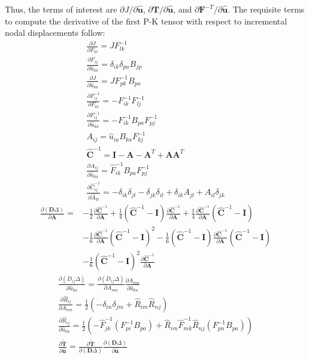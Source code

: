 Thus, the terms of interest are ${\partial J}/{\partial \hat{\bm{u}}}$, ${\partial \bm{T}}/{\partial \hat{\bm{u}}}$, and ${\partial \bm{F}^{-T}}/{\partial \hat{\bm{u}}}$. The requisite terms to compute the derivative of the first P-K tensor with respect to incremental nodal displacements follow:
\begin{gather}
\frac{\partial J}{\partial F_{kl}} = JF_{lk}^{{-1}} \\
\frac{\partial F_{ij}}{\partial \hat{u}_{ka}} = \delta_{ik}\delta_{pa}B_{jp} \\
\frac{\partial J}{\partial \hat{u}_{ka}} = JF_{pk}^{-1}B_{pa} \\
\frac{\partial F_{ij}^{-1}}{\partial F_{kl}} = - F_{ik}^{-1}F_{lj}^{-1} \\
\frac{\partial F_{ij}^{-1}}{\partial \hat{u}_{ka}} = - F_{ik}^{-1}B_{pa}F_{pj}^{-1} \\
A_{ij} = \hat{u}_{ia}B_{ka}F^{-1}_{kj} \\
\hat{{\bm C}}^{-1} = {\bm I} - {\bm A} - {\bm A}^T + {\bm A}{\bm A}^T \\
\frac{\partial A_{ij}}{\partial \hat{u}_{ka}} = \hat{F}^{-1}_{ik}B_{pa}F^{-1}_{pj} \\
\frac{\partial \hat{C}^{-1}_{ij}}{\partial \hat{A}_{kl}} = -\delta_{ik}\delta_{jl} - \delta_{jk}\delta_{il} + \delta_{ik}A_{jl} + A_{il}\delta_{jk}
\end{gather}
\begin{equation}
\begin{aligned}
\frac{\partial ({\bm D}\Delta)}{\partial {\bm A}} = &-\frac{1}{2}\frac{\partial {\hat{\bm C}^{-1}}}{\partial \bm A} + \frac{1}{4}({\hat{\bm C}}^{-1} - {\bm I})\frac{\partial \hat{\bm C}^{-1}}{\partial {\bm A}} + \frac{1}{4}\frac{\partial \hat{\bm C}^{-1}}{\partial {\bm A}}({\hat{\bm C}}^{-1} - {\bm I}) \\
&-\frac{1}{6} \frac{\partial {\hat{\bm C}^{-1}}}{\partial \bm A} (\hat{\bm C}^{-1} - {\bm I})^{2} - \frac{1}{6}  (\hat{\bm C}^{-1} - {\bm I}) \frac{\partial {\hat{\bm C}^{-1}}}{\partial \bm A} (\hat{\bm C}^{-1} - {\bm I}) \\
&- \frac{1}{6}(\hat{\bm C}^{-1} - {\bm I})^{2} \frac{\partial {\hat{\bm C}^{-1}}}{\partial \bm A} 
\end{aligned}
\end{equation}
\begin{gather}
\frac{\partial (D_{ij}\Delta)}{\partial \hat{u}_{ka}} = \frac{\partial (D_{ij}\Delta)}{\partial A_{mn}}\frac{\partial A_{mn}}{\partial \hat{u}_{ka}} \\
\frac{\partial \hat{R}_{ij}}{\partial A_{mn}} = \frac{1}{2}(-\delta_{in}\delta_{jm} + \hat{R}_{im}\hat{R}_{nj}) \\
\frac{\partial \hat{R}_{ij}}{\partial \hat{u}_{ka}} = \frac{1}{2}\left(-\hat{F}_{jk}^{-1}(F_{pi}^{-1}B_{pa}) + \hat{R}_{im}\hat{F}_{mk}^{-1}\hat{R}_{nj}(F_{pn}^{-1}B_{pa})\right) \\
\frac{\partial \tilde{\bm T}}{\partial \hat{\bm u}} = \frac{\partial \tilde{\bm T}}{\partial ({\bm D}\Delta)}\frac{\partial ({\bm D}\Delta)}{\partial \hat{\bm u}}
\end{gather}
